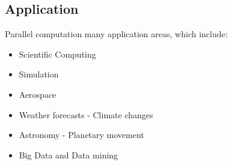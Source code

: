 \subsection{Application}
Parallel computation many application areas, which include:
\begin{itemize}
	\item Scientific Computing
	\item Simulation
	\item Aerospace
	\item Weather forecasts - Climate changes
	\item Astronomy - Planetary movement
	\item Big Data and Data mining
\end{itemize}

\citep{Barney:16}